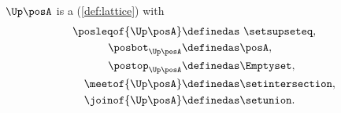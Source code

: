 \begin{lemma}
    \label{lem:u_bounded_lat}
    $\Up \posA$ is a  (\cref{def:lattice}) with
    \begin{equation}
        \begin{aligned}
            \posleqof{\Up \posA} & \definedas \ \setsupseteq, \\
            \posbot_{\Up \posA}  & \definedas \posA, \\
            \postop_{\Up \posA}  & \definedas \Emptyset, \\
            \meetof{\Up \posA}   & \definedas \setintersection, \\
            \joinof{\Up \posA}   & \definedas \setunion.
        \end{aligned}
    \end{equation}
\end{lemma}

